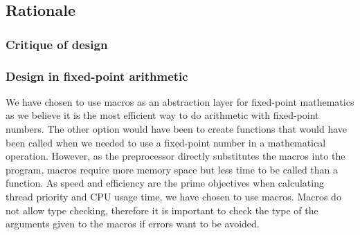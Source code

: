 \documentclass{article}
\renewcommand{\_}{\char`_}
\begin{document}
\subsection{Rationale}
\subsubsection{Critique of design}

\subsubsection{Design in fixed-point arithmetic}

We have chosen to use macros as an abstraction layer for fixed-point mathematics as we believe it is the most efficient way to do arithmetic with fixed-point numbers. The other option would have been to create functions that would have been called when we needed to use a fixed-point number in a mathematical operation. However, as the preprocessor directly substitutes the macros into the program, macros require more memory space but less time to be called than a function. As speed and efficiency are the prime objectives when calculating thread priority and CPU usage time, we have chosen to use macros.
Macros do not allow type checking, therefore it is important to check the type of the arguments given to the macros if errors want to be avoided.

\end{document}

